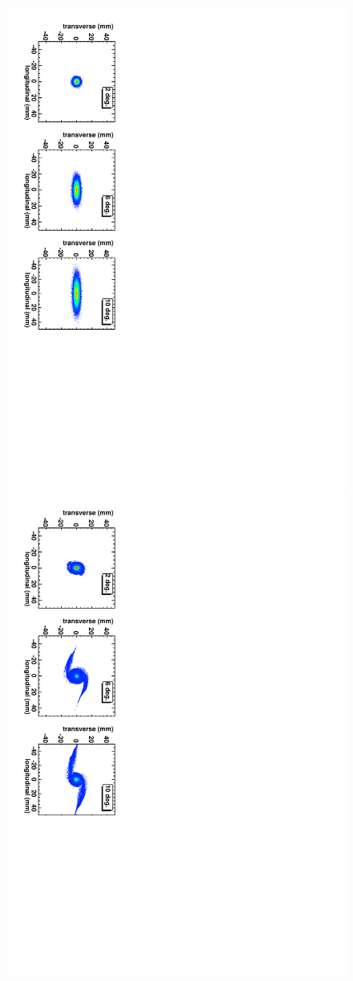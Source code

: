 \documentclass[aps,prstab,twocolumn,superscriptaddress,showpacs]{revtex4}
\begin{document}
\begin{figure}
  \includegraphics[angle=90,width=0.9\linewidth]{figures/Turn-0.pdf}
  \includegraphics[angle=90,width=0.9\linewidth]{figures/Turn-50.pdf}

\end{figure}
\end{document}
